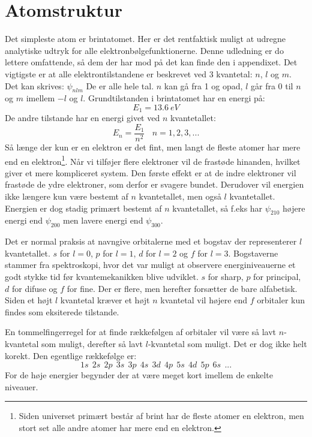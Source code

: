 \documentclass[../../Atom-ogMolekylefysik.tex]{subfiles}
\begin{document}
\section{Atomstruktur}
Det simpleste atom er brintatomet. Her er det rentfaktisk muligt at udregne analytiske udtryk for alle elektronbølgefunktionerne. Denne udledning er do lettere omfattende, så dem der har mod på det kan finde den i appendixet. Det vigtigste er at alle elektrontilstandene er beskrevet ved 3 kvantetal: $n$, $l$ og $m$. Det kan skrives: $\psi_{nlm}$
De er alle hele tal. $n$ kan gå fra 1 og opad, $l$ går fra 0 til $n$ og $m$ imellem $-l$ og $l$.
Grundtilstanden i brintatomet har en energi på:
\begin{equation}
E_1 = \SI{13.6}{eV}    
\end{equation}
De andre tilstande har en energi givet ved $n$ kvantetallet:
\begin{equation}
    E_n = \frac{E_1}{n^2}~~~~n=1,2,3,...
\end{equation}
Så længe der kun er en elektron er det fint, men langt de fleste atomer har mere end en elektron\footnote{Siden universet primært består af brint har de fleste atomer en elektron, men stort set alle andre atomer har mere end en elektron.}.
Når vi tilføjer flere elektroner vil de frastøde hinanden, hvilket giver et mere kompliceret system.
Den første effekt er at de indre elektroner vil frastøde de ydre elektroner, som derfor er svagere bundet. Derudover vil energien ikke længere kun være bestemt af $n$ kvantetallet, men også $l$ kvantetallet. Energien er dog stadig primært bestemt af $n$ kvantetallet, så f.eks har $\psi_{210}$ højere energi end $\psi_{200}$ men lavere energi end $\psi_{300}$.

Det er normal praksis at navngive orbitalerne med et bogstav der representerer $l$ kvantetallet. $s$ for $l=0$, $p$ for $l=1$, $d$ for $l=2$ og $f$ for $l=3$. Bogstaverne stammer fra spektroskopi, hvor det var muligt at observere energiniveauerne et godt stykke tid før kvantemekanikken blive udviklet. $s$ for sharp, $p$ for principal, $d$ for difuse og $f$ for fine. Der er flere, men herefter forsætter de bare alfabetisk. Siden et højt $l$ kvantetal kræver et højt $n$ kvantetal vil højere end $f$ orbitaler kun findes som eksiterede tilstande.

En tommelfingerregel for at finde rækkefølgen af orbitaler vil være så lavt $n$-kvantetal som muligt, derefter så lavt $l$-kvantetal som muligt. Det er dog ikke helt korekt. Den egentlige rækkefølge er:
$$
1s~~2s~~2p~~3s~~3p~~4s~~3d~~4p~~5s~~4d~~5p~~6s~~...
$$
For de høje energier begynder der at være meget kort imellem de enkelte niveauer.
\end{document}
